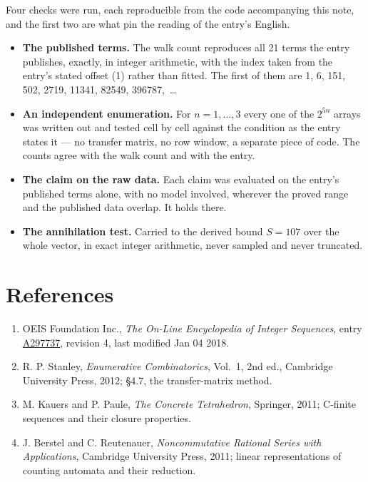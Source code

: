 \documentclass[11pt]{article}
\theoremstyle{definition}
\begin{document}
Four checks were run, each reproducible from the code accompanying this note, and the first two are what pin the reading of the entry's English.

\begin{itemize}

\item {\bfseries The published terms.} The walk count reproduces all 21 terms the entry publishes, exactly, in integer arithmetic, with the index taken from the entry's stated offset (1) rather than fitted. The first of them are 1, 6, 151, 502, 2719, 11341, 82549, 396787,~\dots

\item {\bfseries An independent enumeration.} For $n = 1,\dots,3$ every one of the $2^{5n}$ arrays was written out and tested cell by cell against the condition as the entry states it --- no transfer matrix, no row window, a separate piece of code. The counts agree with the walk count and with the entry.

\item {\bfseries The claim on the raw data.} Each claim was evaluated on the entry's published terms alone, with no model involved, wherever the proved range and the published data overlap. It holds there.

\item {\bfseries The annihilation test.} Carried to the derived bound $S = 107$ over the whole vector, in exact integer arithmetic, never sampled and never truncated.

\end{itemize}

\section{References}

\begin{enumerate}

\item OEIS Foundation Inc., \emph{The On-Line Encyclopedia of Integer Sequences}, entry \href{https://oeis.org/A297737}{A297737}, revision 4, last modified Jan 04 2018.

\item R. P. Stanley, \emph{Enumerative Combinatorics}, Vol.~1, 2nd ed., Cambridge University Press, 2012; \S4.7, the transfer-matrix method.

\item M. Kauers and P. Paule, \emph{The Concrete Tetrahedron}, Springer, 2011; C-finite sequences and their closure properties.

\item J. Berstel and C. Reutenauer, \emph{Noncommutative Rational Series with Applications}, Cambridge University Press, 2011; linear representations of counting automata and their reduction.

\end{enumerate}
\end{document}
